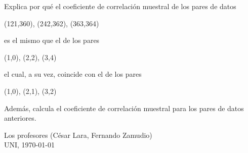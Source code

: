 \documentclass{exam}
\begin{document}
\begin{questions}
\question Explica por qué el coeficiente de correlación muestral de los pares de datos
\begin{center}
	(121,360), (242,362), (363,364)
\end{center}
es el mismo que el de los pares
\begin{center}
	(1,0), (2,2), (3,4)
\end{center}
el cual, a su vez, coincide con el de los pares
\begin{center}
	(1,0), (2,1), (3,2)
\end{center}
Además, calcula el coeficiente de correlación muestral para los pares de datos anteriores.
	\end{questions}
\begin{flushright}
	\hfill Los profesores (César Lara, Fernando Zamudio)\\
	UNI, \today
\end{flushright}
\end{document}
